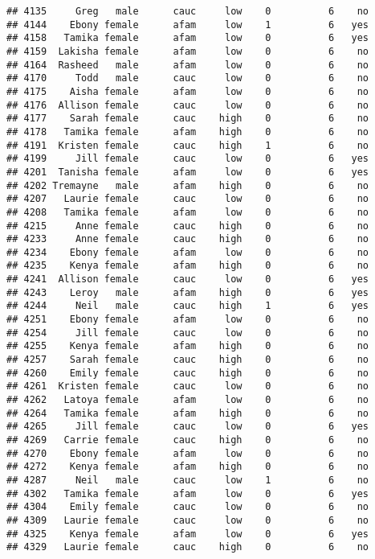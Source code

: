 \documentclass[
]{article}
\begin{document}
\begin{verbatim}
## 4135     Greg   male      cauc     low    0          6    no
## 4144    Ebony female      afam     low    1          6   yes
## 4158   Tamika female      afam     low    0          6   yes
## 4159  Lakisha female      afam     low    0          6    no
## 4164  Rasheed   male      afam     low    0          6    no
## 4170     Todd   male      cauc     low    0          6    no
## 4175    Aisha female      afam     low    0          6    no
## 4176  Allison female      cauc     low    0          6    no
## 4177    Sarah female      cauc    high    0          6    no
## 4178   Tamika female      afam    high    0          6    no
## 4191  Kristen female      cauc    high    1          6    no
## 4199     Jill female      cauc     low    0          6   yes
## 4201  Tanisha female      afam     low    0          6   yes
## 4202 Tremayne   male      afam    high    0          6    no
## 4207   Laurie female      cauc     low    0          6    no
## 4208   Tamika female      afam     low    0          6    no
## 4215     Anne female      cauc    high    0          6    no
## 4233     Anne female      cauc    high    0          6    no
## 4234    Ebony female      afam     low    0          6    no
## 4235    Kenya female      afam    high    0          6    no
## 4241  Allison female      cauc     low    0          6   yes
## 4243    Leroy   male      afam    high    0          6   yes
## 4244     Neil   male      cauc    high    1          6   yes
## 4251    Ebony female      afam     low    0          6    no
## 4254     Jill female      cauc     low    0          6    no
## 4255    Kenya female      afam    high    0          6    no
## 4257    Sarah female      cauc    high    0          6    no
## 4260    Emily female      cauc    high    0          6    no
## 4261  Kristen female      cauc     low    0          6    no
## 4262   Latoya female      afam     low    0          6    no
## 4264   Tamika female      afam    high    0          6    no
## 4265     Jill female      cauc     low    0          6   yes
## 4269   Carrie female      cauc    high    0          6    no
## 4270    Ebony female      afam     low    0          6    no
## 4272    Kenya female      afam    high    0          6    no
## 4287     Neil   male      cauc     low    1          6    no
## 4302   Tamika female      afam     low    0          6   yes
## 4304    Emily female      cauc     low    0          6    no
## 4309   Laurie female      cauc     low    0          6    no
## 4325    Kenya female      afam     low    0          6   yes
## 4329   Laurie female      cauc    high    0          6    no

\end{verbatim}
\end{document}

